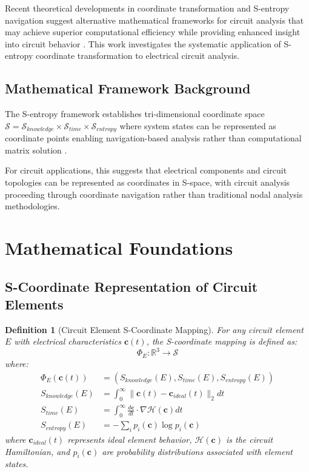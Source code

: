 \documentclass[12pt,a4paper]{article}
\newtheorem{definition}{Definition}
\begin{document}
Recent theoretical developments in coordinate transformation and S-entropy navigation suggest alternative mathematical frameworks for circuit analysis that may achieve superior computational efficiency while providing enhanced insight into circuit behavior \cite{cover2006elements}. This work investigates the systematic application of S-entropy coordinate transformation to electrical circuit analysis.

\subsection{Mathematical Framework Background}

The S-entropy framework establishes tri-dimensional coordinate space $\mathcal{S} = \mathcal{S}_{knowledge} \times \mathcal{S}_{time} \times \mathcal{S}_{entropy}$ where system states can be represented as coordinate points enabling navigation-based analysis rather than computational matrix solution \cite{shannon1948mathematical}.

For circuit applications, this suggests that electrical components and circuit topologies can be represented as coordinates in S-space, with circuit analysis proceeding through coordinate navigation rather than traditional nodal analysis methodologies.

\section{Mathematical Foundations}

\subsection{S-Coordinate Representation of Circuit Elements}

\begin{definition}[Circuit Element S-Coordinate Mapping]
For any circuit element $E$ with electrical characteristics $\mathbf{c}(t)$, the S-coordinate mapping is defined as:
\begin{equation}
\Phi_E: \mathbb{R}^3 \to \mathcal{S}
\end{equation}
where:
\begin{align}
\Phi_E(\mathbf{c}(t)) &= (S_{knowledge}(E), S_{time}(E), S_{entropy}(E)) \\
S_{knowledge}(E) &= \int_0^{\infty} \|\mathbf{c}(t) - \mathbf{c}_{ideal}(t)\|_2 dt \\
S_{time}(E) &= \int_0^{\infty} \frac{d\mathbf{c}}{dt} \cdot \nabla \mathcal{H}(\mathbf{c}) dt \\
S_{entropy}(E) &= -\sum_i p_i(\mathbf{c}) \log p_i(\mathbf{c})
\end{align}
where $\mathbf{c}_{ideal}(t)$ represents ideal element behavior, $\mathcal{H}(\mathbf{c})$ is the circuit Hamiltonian, and $p_i(\mathbf{c})$ are probability distributions associated with element states.
\end{definition}
\end{document}
